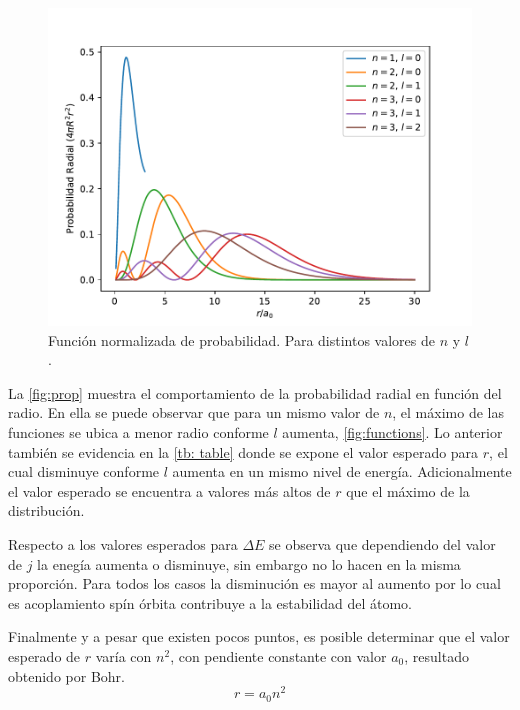 \documentclass[paper=letter, fontsize=11pt]{scrartcl}
\begin{document}
\begin{figure}[!ht]
	\centering
	\includegraphics[width=\linewidth]{probability.pdf}
	\caption{Funci\'on normalizada de probabilidad. Para distintos valores de $n$ y $l$.}
	\label{fig:prop}
\end{figure}

La \autoref{fig:prop} muestra el comportamiento de la probabilidad radial en funci\'on del radio. En ella se puede observar que para un mismo valor de $n$, el m\'aximo de las funciones se ubica a menor radio conforme $l$ aumenta, \autoref{fig:functions}. Lo anterior tambi\'en se evidencia en la \autoref{tb: table} donde se expone el valor esperado para $r$, el cual disminuye conforme $l$ aumenta en un mismo nivel de energ\'ia. Adicionalmente el valor esperado se encuentra a valores m\'as altos de $r$ que el m\'aximo de la distribuci\'on.

Respecto a los valores esperados para $\Delta E$ se observa que dependiendo del valor de $j$ la eneg\'ia aumenta o disminuye, sin embargo no lo hacen en la misma proporci\'on. Para todos los casos la disminuci\'on es mayor al aumento por lo cual es acoplamiento sp\'in \'orbita contribuye a la estabilidad del \'atomo.

Finalmente y a pesar que existen pocos puntos, es posible determinar que el valor esperado de $r$ var\'ia con $n^2$, con pendiente constante con valor $a_0$, resultado obtenido por Bohr.
\begin{equation}
	r = a_0n^2
\end{equation}
\end{document}
